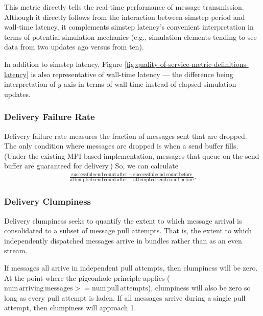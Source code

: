 This metric directly tells the real-time performance of message transmission.
Although it directly follows from the interaction between simstep period and wall-time latency, it complements simstep latency's convenient interpretation in terms of potential simulation mechanics (e.g., simulation elements tending to see data from two updates ago versus from ten).

In addition to simstep latency, Figure \ref{fig:quality-of-service-metric-definitions-latency} is also representative of wall-time latency --- the difference being interpretation of $y$ axis in terms of wall-time instead of elapsed simulation updates.

\subsubsection{Delivery Failure Rate} \label{sec:delivery-failure-rate-metric}

Delivery failure rate measures the fraction of messages sent that are dropped.
The only condition where messages are dropped is when a send buffer fills.
(Under the existing MPI-based implementation, messages that queue on the send buffer are guaranteed for delivery.)
So, we can calculate
\begin{align*}
  \frac{
    \mathrm{successful\,send\,count\,after} - \mathrm{successful\,send\,count\,before}
  }{
    \mathrm{attempted\,send\,count\,after} - \mathrm{attempted\,send\,count\,before}
  }.
\end{align*}

\subsubsection{Delivery Clumpiness} \label{sec:delivery-clumpiness-metric}

Delivery clumpiness seeks to quantify the extent to which message arrival is consolidated to a subset of message pull attempts.
That is, the extent to which independently dispatched messages arrive in bundles rather than as an even stream.

If messages all arrive in independent pull attempts, then clumpiness will be zero.
At the point where the pigeonhole principle applies ($\mathrm{num\,arriving\,messages} >= \mathrm{num\,pull\,attempts}$), clumpiness will also be zero so long as every pull attempt is laden.
If all messages arrive during a single pull attempt, then clumpiness will approach 1.

